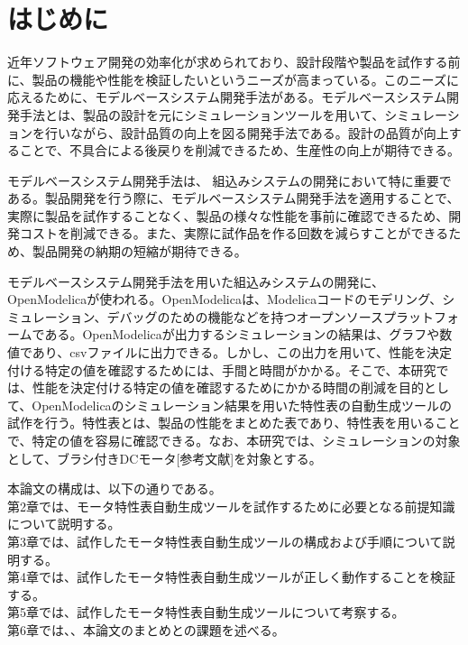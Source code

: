 \chapter{はじめに}\label{cha:Introduction}
近年ソフトウェア開発の効率化が求められており、設計段階や製品を試作する前に、製品の機能や性能を検証したいというニーズが高まっている\cite{modelicaモデルベース本}。このニーズに応えるために、モデルベースシステム開発手法がある\cite{modelicaモデルベース本}。モデルベースシステム開発手法とは、製品の設計を元にシミュレーションツールを用いて、シミュレーションを行いながら、設計品質の向上を図る開発手法である\cite{ipa_2016}。設計の品質が向上することで、不具合による後戻りを削減できるため、生産性の向上が期待できる\cite{ipa_2016}。

モデルベースシステム開発手法は、 組込みシステムの開発において特に重要である\cite{ipa_useful_modelbase_dev}。製品開発を行う際に、モデルベースシステム開発手法を適用することで、実際に製品を試作することなく、製品の様々な性能を事前に確認できるため、開発コストを削減できる\cite{modelicaモデルベース本}。また、実際に試作品を作る回数を減らすことができるため、製品開発の納期の短縮が期待できる。

モデルベースシステム開発手法を用いた組込みシステムの開発に、OpenModelica\cite{open_modelica}が使われる。OpenModelicaは、Modelica\cite{modelicaモデルベース本}コードのモデリング、シミュレーション、デバッグのための機能などを持つオープンソースプラットフォームである。OpenModelicaが出力するシミュレーションの結果は、グラフや数値であり、csvファイルに出力できる。しかし、この出力を用いて、性能を決定付ける特定の値を確認するためには、手間と時間がかかる。そこで、本研究では、性能を決定付ける特定の値を確認するためにかかる時間の削減を目的として、OpenModelicaのシミュレーション結果を用いた特性表の自動生成ツールの試作を行う。特性表とは、製品の性能をまとめた表であり、特性表を用いることで、特定の値を容易に確認できる。なお、本研究では、シミュレーションの対象として、ブラシ付きDCモータ[参考文献]を対象とする。



本論文の構成は、以下の通りである。\\
第2章では、モータ特性表自動生成ツールを試作するために必要となる前提知識について説明する。\\
第3章では、試作したモータ特性表自動生成ツールの構成および手順について説明する。\\
第4章では、試作したモータ特性表自動生成ツールが正しく動作することを検証する。\\
第5章では、試作したモータ特性表自動生成ツールについて考察する。\\
第6章では、、本論文のまとめとの課題を述べる。\\